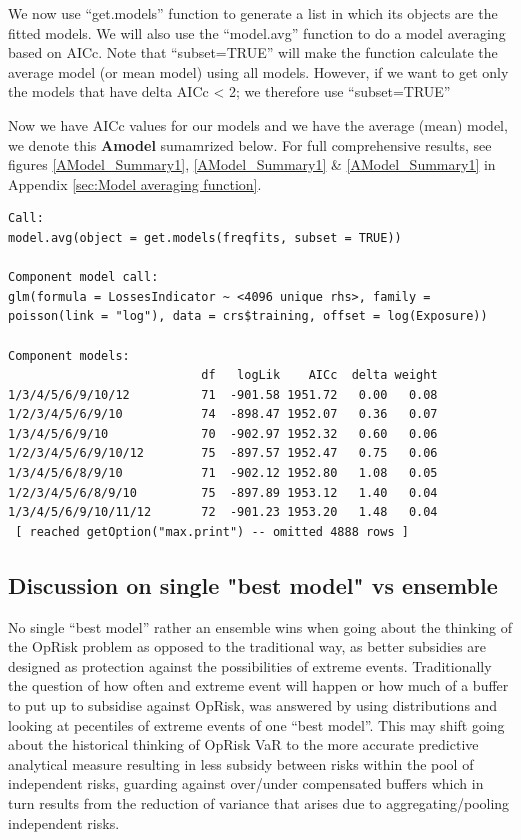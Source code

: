\documentclass{DissertateUSU}
\begin{document}
We now use ``get.models'' function to generate a list in which its
objects are the fitted models. We will also use the ``model.avg''
function to do a model averaging based on AICc. Note that
``subset=TRUE'' will make the function calculate the average model (or
mean model) using all models. However, if we want to get only the models
that have delta AICc \textless{} 2; we therefore use ``subset=TRUE''

\singlespacing

\doublespacing

Now we have AICc values for our models and we have the average (mean)
model, we denote this \textbf{Amodel} sumamrized below. For full
comprehensive results, see figures \ref{AModel_Summary1},
\ref{AModel_Summary1} \& \ref{AModel_Summary1} in Appendix
\ref{sec:Model averaging function}. \medskip

\singlespacing
\begin{verbatim}
Call:
model.avg(object = get.models(freqfits, subset = TRUE))

Component model call: 
glm(formula = LossesIndicator ~ <4096 unique rhs>, family = 
poisson(link = "log"), data = crs$training, offset = log(Exposure))

Component models: 
                           df   logLik    AICc  delta weight
1/3/4/5/6/9/10/12          71  -901.58 1951.72   0.00   0.08
1/2/3/4/5/6/9/10           74  -898.47 1952.07   0.36   0.07
1/3/4/5/6/9/10             70  -902.97 1952.32   0.60   0.06
1/2/3/4/5/6/9/10/12        75  -897.57 1952.47   0.75   0.06
1/3/4/5/6/8/9/10           71  -902.12 1952.80   1.08   0.05
1/2/3/4/5/6/8/9/10         75  -897.89 1953.12   1.40   0.04
1/3/4/5/6/9/10/11/12       72  -901.23 1953.20   1.48   0.04
 [ reached getOption("max.print") -- omitted 4888 rows ]

\end{verbatim}       
\doublespacing

\subsection{Discussion on single "best model" vs ensemble}

No single ``best model'' rather an ensemble wins when going about the
thinking of the OpRisk problem as opposed to the traditional way, as
better subsidies are designed as protection against the possibilities of
extreme events. Traditionally the question of how often and extreme
event will happen or how much of a buffer to put up to subsidise against
OpRisk, was answered by using distributions and looking at pecentiles of
extreme events of one ``best model''. This may shift going about the
historical thinking of OpRisk VaR to the more accurate predictive
analytical measure resulting in less subsidy between risks within the
pool of independent risks, guarding against over/under compensated
buffers which in turn results from the reduction of variance that arises
due to aggregating/pooling independent risks.
\end{document}
